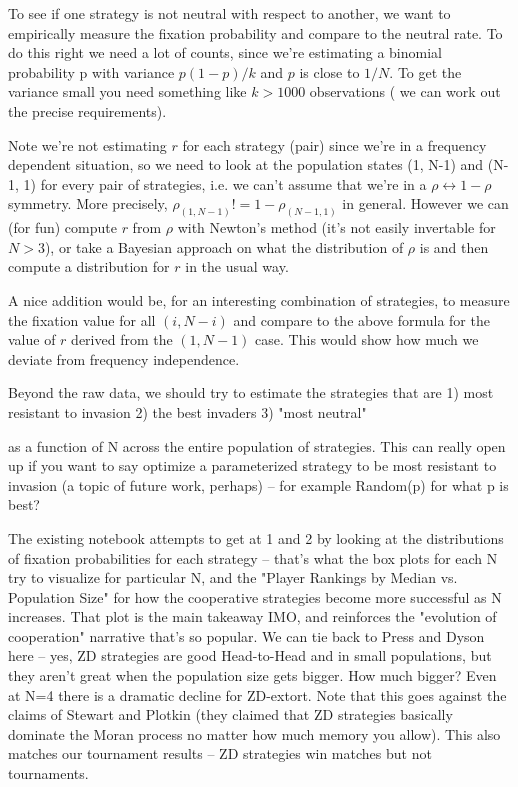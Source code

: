 \documentclass{article}
\begin{document}
To see if one strategy is not neutral with respect to another, we want to
empirically measure the fixation probability and compare to the neutral rate. To
do this right we need a lot of counts, since we're estimating a binomial
probability p with variance $p(1-p) / k$ and $p$ is close to $1 / N$. To get the
variance small you need something like $k>1000$ observations ( we can work out
the precise requirements).

Note we're not estimating $r$ for each strategy (pair) since we're in a
frequency dependent situation, so we need to look at the population states (1,
N-1) and (N-1, 1) for every pair of strategies, i.e. we can't assume that we're
in a $\rho \leftrightarrow 1-\rho$ symmetry. More precisely, $\rho_{(1, N-1)} !=
1 - \rho_{(N-1, 1)}$ in general. However we can (for fun) compute $r$ from
$\rho$ with Newton's method (it's not easily invertable for $N > 3$), or take a
Bayesian approach on what the distribution of $\rho$ is and then compute a
distribution for $r$ in the usual way.

A nice addition would be, for an interesting combination of strategies, to
measure the fixation value for all $(i, N-i)$ and compare to the above formula
for the value of $r$ derived from the $(1, N-1)$ case. This would show how much
we deviate from frequency independence.

Beyond the raw data, we should try to estimate the strategies that are
1) most resistant to invasion
2) the best invaders
3) "most neutral"

as a function of N across the entire population of strategies. This can really
open up if you want to say optimize a parameterized strategy to be most
resistant to invasion (a topic of future work, perhaps) -- for example Random(p)
for what p is best?

The existing notebook attempts to get at 1 and 2 by looking at the distributions
of fixation probabilities for each strategy -- that's what the box plots for
each N try to visualize for particular N, and the "Player Rankings by Median vs.
Population Size" for how the cooperative strategies become more successful as N
increases. That plot is the main takeaway IMO, and reinforces the "evolution of
cooperation" narrative that's so popular. We can tie back to Press and Dyson
here -- yes, ZD strategies are good Head-to-Head and in small populations, but
they aren't great when the population size gets bigger. How much bigger? Even at
N=4 there is a dramatic decline for ZD-extort. Note that this goes against the
claims of Stewart and Plotkin (they claimed that ZD strategies basically
dominate the Moran process no matter how much memory you allow). This also
matches our tournament results -- ZD strategies win matches but not tournaments.
\end{document}
